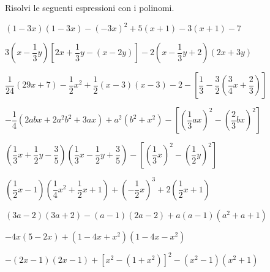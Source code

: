 \begin{esercizio}
\label{ese:10.23}
Risolvi le seguenti espressioni con i polinomi.
 \begin{enumeratea}
 \item $(1-3x)(1-3x)-(-3x)^{2}+5(x+1)-3(x+1)-7$
 \item 
$3\left(x-\dfrac{1}{3}y\right)\left[2x+\dfrac{1}{3}y-(x-2y)\right]
-2\left(x-\dfrac{1}{3}y+2\right)(2x+3y)$
 \item 
$\dfrac{1}{24}(29x+7)-\dfrac{1}{2}x^{2}+\dfrac{1}{2}(x-3)(x-3)-2-\left[\dfrac{1}
{3}-\dfrac{3}{2}\left(\dfrac{3}{4}x+\dfrac{2}{3}\right)\right]$
 \item $-{\dfrac{1}{4}}\left(2 abx+2a^{2}b^{2}+3 
ax\right)+a^{2}(b^{2}+x^{2})-\left[\left(\dfrac{1}{3} 
ax\right)^{2}-\left(\dfrac{2}{3}bx\right)^{2}\right]$
 \item 
$\left(\dfrac{1}{3}x+\dfrac{1}{2}y-\dfrac{3}{5}\right)\left(\dfrac{1}{3}x-\dfrac
{1}{2}y+\dfrac{3}{5}\right)-\left[\left(\dfrac{1}{3}x\right)^{2}-\left(\dfrac{1}
{2}y\right)^{2}\right]$
 \item 
$\left(\dfrac{1}{2}x-1\right)\left(\dfrac{1}{4}x^{2}+\dfrac{1}{2}
x+1\right)+\left(-{\dfrac{1}{2}}x\right)^{3}+2\left(\dfrac{1}{2}x+1\right)$
 \item $(3a-2)(3a+2)-(a-1)(2a-2)+a(a-1)\left(a^{2}+a+1\right)$
 \item $-4x(5-2x)+\left(1-4x+x^{2}\right)\left(1-4x-x^{2}\right)$
 \item 
$-(2x-1)(2x-1)+\left[x^{2}-\left(1+x^{2}\right)\right]^{2}-\left(x^{2}
-1\right)\left(x^{2}+1\right)$
 \end{enumeratea}
\end{esercizio}

